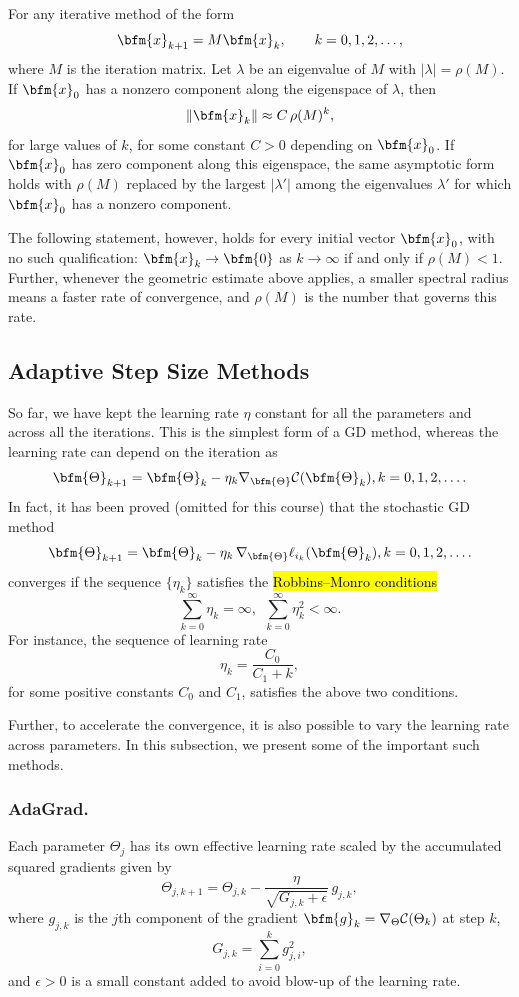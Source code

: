 \begin{note}
For any iterative method of the form
$$
\bfm{x}_{k+1} = M \bfm{x}_k, \qquad k=0,1,2,\ldots,
$$
where $M$ is the iteration matrix. Let $\lambda$ be an eigenvalue of $M$ with $|\lambda|=\rho(M)$. If $\bfm{x}_0$ has a nonzero component along the eigenspace of $\lambda$, then
$$
\|\bfm{x}_k\| \approx C\, \rho(M)^k,
$$
for large values of $k$, for some constant $C>0$ depending on $\bfm{x}_0$. If $\bfm{x}_0$ has zero component along this eigenspace, the same asymptotic form holds with $\rho(M)$ replaced by the largest $|\lambda'|$ among the eigenvalues $\lambda'$ for which $\bfm{x}_0$ has a nonzero component.

The following statement, however, holds for every initial vector $\bfm{x}_0$, with no such qualification: $\bfm{x}_k \to \bfm{0}$ as $k\to\infty$ if and only if $\rho(M) < 1$. Further, whenever the geometric estimate above applies, a smaller spectral radius means a faster rate of convergence, and $\rho(M)$ is the number that governs this rate.
\end{note}
\subsection{Adaptive Step Size Methods}
So far, we have kept the learning rate $\eta$ constant for all the parameters and across all the iterations.  This is the simplest form of a GD method, whereas the learning rate can depend on the iteration as
$$
\bfm{\Theta}_{k+1} = \bfm{\Theta}_k  - \eta_k \nabla_{\bfm{\Theta}}
\mathcal{C}(\bfm{\Theta}_k), k=0,1,2,\ldots.
$$
In fact, it has been proved (omitted for this course) that the stochastic GD method
$$
\bfm{\Theta}_{k+1} = \bfm{\Theta}_k  - \eta_k\, \nabla_{\bfm{\Theta}} \ell_{i_k}(\bfm{\Theta}_k), k=0,1,2,\ldots.
$$
converges if the sequence $\{\eta_k\}$ satisfies the \hl{Robbins–Monro conditions}
$$
\sum_{k=0}^\infty \eta_k = \infty,~~\sum_{k=0}^\infty \eta_k^2 < \infty.
$$
For instance, the sequence of learning rate
$$\eta_k = \frac{C_0}{C_1+k},$$
for some positive constants $C_0$ and $C_1$, satisfies the above two conditions.

Further, to accelerate the convergence, it is also possible to vary the learning rate across parameters. In this subsection, we present some of the important such methods.
\subsubsection{AdaGrad.}
Each parameter $\Theta_j$ has its own effective learning rate scaled by the accumulated squared gradients given by
$$
\Theta_{j,k+1} = \Theta_{j,k} - \frac{\eta}{\sqrt{G_{j,k} + \epsilon}} \, g_{j,k},
$$
where $g_{j,k}$ is the $j$th component of the gradient $\bfm{g}_k = \nabla_\Theta \mathcal{C}(\Theta_k)$ at step $k$, 
$$
G_{j,k} = \sum_{i=0}^k g_{j,i}^2,
$$
and $\epsilon>0$ is a small constant added to avoid blow-up of the learning rate.

